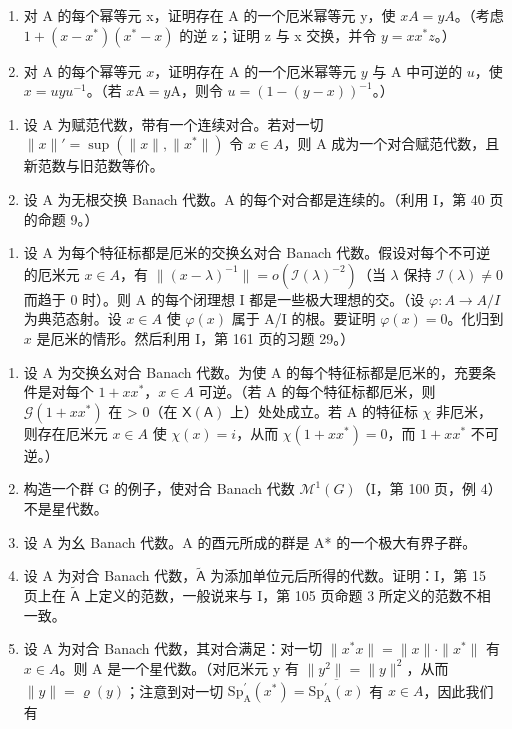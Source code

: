 \begin{enumerate}
\def\labelenumi{\alph{enumi})}
\item
  对 A 的每个幂等元 x，证明存在 A 的一个厄米幂等元 y，使 \(xA = yA\)。（考虑 \(1 + (x - x^{*})(x^{*} - x)\) 的逆 z；证明 z 与 x 交换，并令 \(y = xx^{*}z\)。）
\item
  对 A 的每个幂等元 \(x\)，证明存在 A 的一个厄米幂等元 \(y\) 与 A 中可逆的 \(u\)，使 \(x = uyu^{-1}\)。（若 \(x\mathrm{A} = y\mathrm{A}\)，则令 \(u = (1 - (y - x))^{-1}\)。）
\end{enumerate}

\begin{enumerate}
\def\labelenumi{\arabic{enumi})}
\setcounter{enumi}{3}
\item
  设 A 为赋范代数，带有一个连续对合。若对一切 \(\|x\|' = \sup(\|x\|, \|x^{*}\|)\) 令 \(x \in A\)，则 A 成为一个对合赋范代数，且新范数与旧范数等价。
\item
  设 A 为无根交换 Banach 代数。A 的每个对合都是连续的。（利用 I，第 40 页的命题 9。）
\end{enumerate}

\begin{enumerate}
\def\labelenumi{¶ \arabic{enumi})}
\setcounter{enumi}{5}
\tightlist
\item
  设 A 为每个特征标都是厄米的交换幺对合 Banach 代数。假设对每个不可逆的厄米元 \(x \in A\)，有 \(\|(x - \lambda)^{-1}\| = o(\mathcal{I}(\lambda)^{-2})\)（当 \(\lambda\) 保持 \(\mathcal{I}(\lambda) \neq 0\) 而趋于 0 时）。则 A 的每个闭理想 I 都是一些极大理想的交。（设 \(\varphi: A \longrightarrow A/I\) 为典范态射。设 \(x \in A\) 使 \(\varphi(x)\) 属于 A/I 的根。要证明 \(\varphi(x) = 0\)。化归到 \(x\) 是厄米的情形。然后利用 I，第 161 页的习题 29。）
\end{enumerate}

\begin{enumerate}
\def\labelenumi{\arabic{enumi})}
\setcounter{enumi}{6}
\item
  设 A 为交换幺对合 Banach 代数。为使 A 的每个特征标都是厄米的，充要条件是对每个 \(1 + xx^{*}\)，\(x \in A\) 可逆。（若 A 的每个特征标都厄米，则 \(\mathcal{G}(1 + xx^{*})\) 在 \textgreater{} 0（在 \(\mathsf{X}(\mathsf{A})\) 上）处处成立。若 A 的特征标 \(\chi\) 非厄米，则存在厄米元 \(x \in A\) 使 \(\chi(x) = i\)，从而 \(\chi(1 + xx^{*}) = 0\)，而 \(1 + xx^{*}\) 不可逆。）
\item
  构造一个群 G 的例子，使对合 Banach 代数 \(\mathcal{M}^{1}(G)\)（I，第 100 页，例 4）不是星代数。
\item
  设 A 为幺 Banach 代数。A 的酉元所成的群是 A* 的一个极大有界子群。
\item
  设 A 为对合 Banach 代数，\(\widetilde{\mathsf{A}}\) 为添加单位元后所得的代数。证明：I，第 15 页上在 \(\widetilde{\mathsf{A}}\) 上定义的范数，一般说来与 I，第 105 页命题 3 所定义的范数不相一致。
\item
  设 A 为对合 Banach 代数，其对合满足：对一切 \(\|x^{*}x\| = \|x\| \cdot \|x^{*}\|\) 有 \(x \in A\)。则 A 是一个星代数。（对厄米元 y 有 \(\|y^{2}\| = \|y\|^{2}\)，从而 \(\|y\| = \varrho(y)\)；注意到对一切 \(\mathrm{Sp}_{\mathrm{A}}^{\prime}(x^{*}) = \overline{\mathrm{Sp}_{\mathrm{A}}^{\prime}(x)}\) 有 \(x \in A\)，因此我们有
\end{enumerate}

